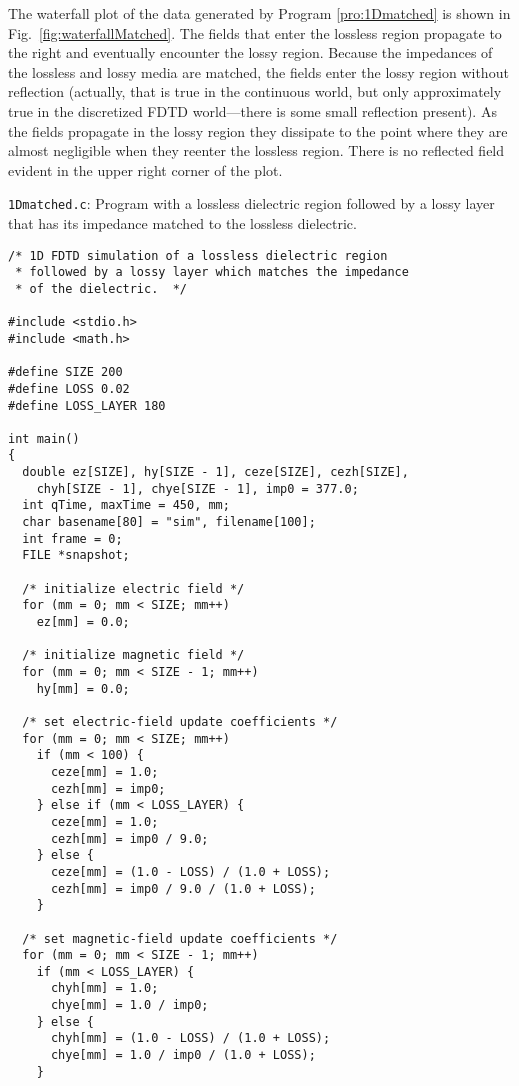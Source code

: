 The waterfall plot of the data generated by Program
\ref{pro:1Dmatched} is shown in Fig.\ \ref{fig:waterfallMatched}.  The
fields that enter the lossless region propagate to the right and
eventually encounter the lossy region.  Because the impedances of the
lossless and lossy media are matched, the fields enter the lossy
region without reflection (actually, that is true in the continuous
world, but only approximately true in the discretized FDTD
world---there is some small reflection present).  As the fields
propagate in the lossy region they dissipate to the point where they
are almost negligible when they reenter the lossless region.  There is
no reflected field evident in the upper right corner of the plot.

\begin{program}
{\tt 1Dmatched.c}: 
Program with a lossless dielectric region followed by a lossy layer
that has its impedance matched to the lossless
dielectric. \label{pro:1Dmatched}
\codemiddle
\begin{lstlisting}
/* 1D FDTD simulation of a lossless dielectric region
 * followed by a lossy layer which matches the impedance
 * of the dielectric.  */

#include <stdio.h>
#include <math.h>

#define SIZE 200
#define LOSS 0.02
#define LOSS_LAYER 180

int main()
{
  double ez[SIZE], hy[SIZE - 1], ceze[SIZE], cezh[SIZE],
    chyh[SIZE - 1], chye[SIZE - 1], imp0 = 377.0;
  int qTime, maxTime = 450, mm;
  char basename[80] = "sim", filename[100];
  int frame = 0;
  FILE *snapshot;

  /* initialize electric field */
  for (mm = 0; mm < SIZE; mm++)
    ez[mm] = 0.0;

  /* initialize magnetic field */
  for (mm = 0; mm < SIZE - 1; mm++)
    hy[mm] = 0.0;

  /* set electric-field update coefficients */
  for (mm = 0; mm < SIZE; mm++)
    if (mm < 100) {
      ceze[mm] = 1.0;
      cezh[mm] = imp0;
    } else if (mm < LOSS_LAYER) {
      ceze[mm] = 1.0;
      cezh[mm] = imp0 / 9.0;
    } else {
      ceze[mm] = (1.0 - LOSS) / (1.0 + LOSS);
      cezh[mm] = imp0 / 9.0 / (1.0 + LOSS);
    }

  /* set magnetic-field update coefficients */
  for (mm = 0; mm < SIZE - 1; mm++)
    if (mm < LOSS_LAYER) {
      chyh[mm] = 1.0;
      chye[mm] = 1.0 / imp0;
    } else {
      chyh[mm] = (1.0 - LOSS) / (1.0 + LOSS);
      chye[mm] = 1.0 / imp0 / (1.0 + LOSS);
    }


\end{lstlisting}
\end{program}

